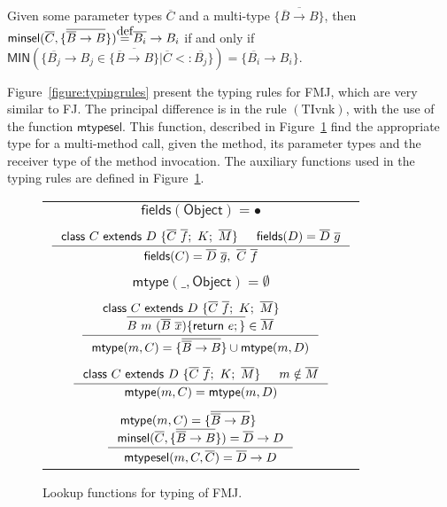 \documentclass[hidelinks, twocolumn]{article}
\newcommand\rulename[1]{\mathrm{(#1)}}
\newcommand\myeq{\stackrel{\mathclap{\normalfont\mbox{def}}}{=}}
\newcommand{\clases}[1][D]{\mathsf{class} \ C \ \mathsf{extends} \ #1 \ \{ \overline{C} \ \overline{f}; \ K; \ \overline{M}\}}
\newcommand{\metodo}[1][C]{#1 \ m \ (\overline{#1} \ \overline{x})\{\mathsf{return} \ e;\}}
\newcommand{\mtypesel}{\mathsf{mtypesel} (m, C, \overline{C})}
\newcommand{\mtype}[1][C]{\mathsf{mtype} (m, #1)}
\newcommand{\fields}[1][C]{\mathsf{fields} (#1)}
\newcommand{\multt}[1][B]{\{ \overline{\overline{#1} \to #1} \}}
\begin{document}
\begin{definition}
\label{definition:mss}
\mbox{}
Given some parameter  types $\overline{C}$
and a multi-type $\multt$, then $\mathsf{minsel}(\overline{C}, \multt) \myeq \overline{B_i} \to B_i$ if and only if $\mathsf{MIN}(\{\overline{B_j} \to B_j \in \multt|\overline{C} <: \overline{B_j}\}) = \{ \overline{B_i} \to B_i\}$.
\end{definition}

Figure~\ref{figure:typingrules} present the typing rules for FMJ, which are very similar to FJ. The principal difference is in the rule $\rulename{TIvnk}$, with the use of the function $\mathsf{mtypesel}$. This function, described in Figure~\ref{figure:lookup_functions_typing} find the appropriate type for a multi-method call, given the method, its parameter types  and the receiver type of the method invocation. The auxiliary functions used in the typing rules are defined in Figure~\ref{figure:lookup_functions_typing}.
\begin{figure}[h]
\begin{small}
\begin{center}
\begin{tabular}{c}
$\mathsf{fields}(\mathsf{Object}) = \bullet $\\
\\
$\inference{\clases & \fields[D] = \overline{D} \ \overline{g}} {\fields[C] = \overline{D} \ \overline{g}, \ \overline{C} \ \overline{f}} $\\
\\
$\mathsf{mtype}(\_, \mathsf{Object}) = \emptyset$\\
\\
$\inference{\clases & \\ \overline {\metodo[B]} \in \overline{M}}{\mtype = \multt 	\cup \mtype[D]} $\\
\\
$\inference{\clases & m \notin \overline{M}}{\mtype = \mtype[D]}$\\
\\
$\inference{\mtype = \multt & \\ \mathsf{minsel}(\overline{C}, \multt) = \overline{D} \to D} {\mtypesel = \overline{D} \to D}$\\
\end{tabular}
\caption{Lookup functions for typing of FMJ.}
\label{figure:lookup_functions_typing}
\end{center}
\end{small}
\end{figure}
\end{document}

